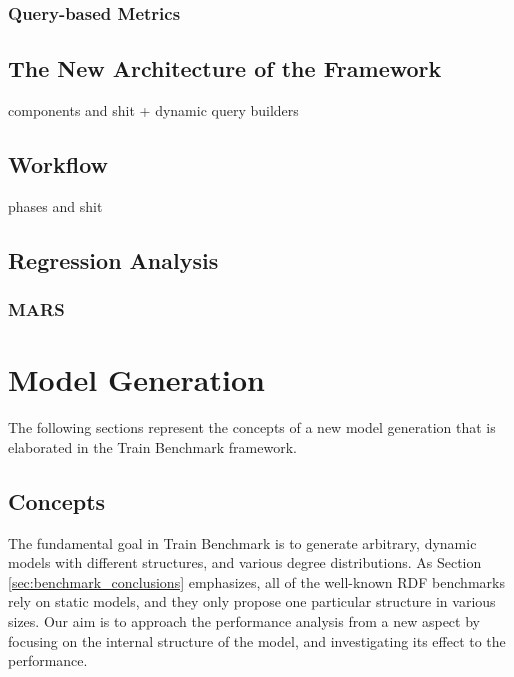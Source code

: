 \subsubsection{Query-based Metrics}
\subsection{The New Architecture of the Framework}
components and shit
+ dynamic query builders
\subsection{Workflow}
phases and shit

\subsection{Regression Analysis}

\subsubsection{MARS}


\section{Model Generation} 

The following sections represent the concepts of a new model generation that is elaborated in the Train Benchmark framework.
\subsection{Concepts}
The fundamental goal in Train Benchmark is to generate arbitrary, dynamic models with different structures, and various degree distributions. As Section \ref{sec:benchmark_conclusions} emphasizes, all of the well-known RDF benchmarks rely on static models, and they only propose one particular structure in various sizes. Our aim is to approach the performance analysis from a new aspect by focusing on the internal structure of the model, and investigating its effect to the performance.

